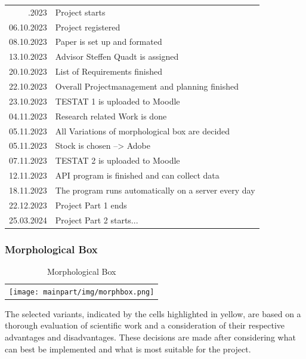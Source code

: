 \begin{table}[H]
	\centering
	\renewcommand\arraystretch{1.4}
	\begin{tabular}{@{\,}r <{\hskip 2pt} !{\foo} >{\raggedright\arraybackslash}p{5cm}}
		\toprule
		.2023 & Project starts\\
		06.10.2023 & Project registered\\
		08.10.2023 & Paper is set up and formated\\
		13.10.2023 & Advisor Steffen Quadt is assigned\\
		20.10.2023 & List of Requirements finished\\
		22.10.2023 & Overall Projectmanagement and planning finished\\
		23.10.2023 & TESTAT 1 is uploaded to Moodle\\
		04.11.2023 & Research related Work is done\\
		05.11.2023 & All Variations of morphological box are decided\\
		05.11.2023 & Stock is chosen --> Adobe\\
		07.11.2023 & TESTAT 2 is uploaded to Moodle\\
		12.11.2023 & \ac{API} program is finished and can collect data\\
		18.11.2023 & The program runs automatically on a server every day\\	
		22.12.2023 & Project Part 1 ends\\
		25.03.2024 & Project Part 2 starts...\
	\end{tabular}
	\label{tab: timeline}
\end{table}
\clearpage
\subsubsection{Morphological Box}\label{sec: Morphological Box}
\begin{table}[H]
	\centering
	\begin{tabular}{c}
		\texttt{[image: mainpart/img/morphbox.png]} \\
	\end{tabular}
	\caption{Morphological Box}
	\label{tab: morphological box}
\end{table}
The selected variants, indicated by the cells highlighted in yellow, are based on a thorough evaluation of scientific work and a consideration of their respective advantages and disadvantages. These decisions are made after considering what can best be implemented and what is most suitable for the project. 
